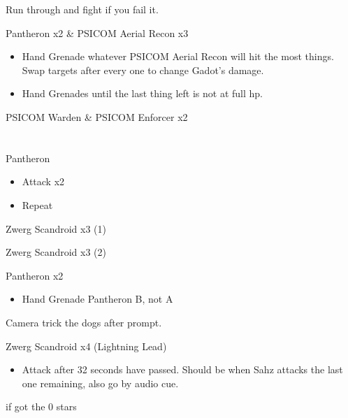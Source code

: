 \documentclass{report}
\begin{document}
Run through and fight if you fail it.

\begin{battle}{Pantheron x2 \& PSICOM Aerial Recon x3}
\begin{itemize}
    \item Hand Grenade whatever PSICOM Aerial Recon will hit the most things. Swap targets after every one to change Gadot's damage.
    \item Hand Grenades until the last thing left is not at full hp.
\end{itemize}

\end{battle}

\begin{battle}{PSICOM Warden \& PSICOM Enforcer x2}
\end{battle}


\chapter{}

\begin{battle}{Pantheron}
\begin{itemize}
    \item Attack x2
    \item Repeat
\end{itemize}
\end{battle}

\begin{battle}{Zwerg Scandroid x3 (1)}
\end{battle}

\begin{battle}{Zwerg Scandroid x3 (2)}
\end{battle}

\begin{battle}{Pantheron x2}
\begin{itemize}
    \item Hand Grenade Pantheron B, not A
\end{itemize}
\end{battle}

Camera trick the dogs after prompt.

\begin{battle}{Zwerg Scandroid x4 (Lightning Lead)}
\begin{itemize}
    \item Attack after 32 seconds have passed. Should be when Sahz attacks the last one remaining, also go by audio cue.
\end{itemize}
 if got the 0 stars
\end{battle}
\end{document}
